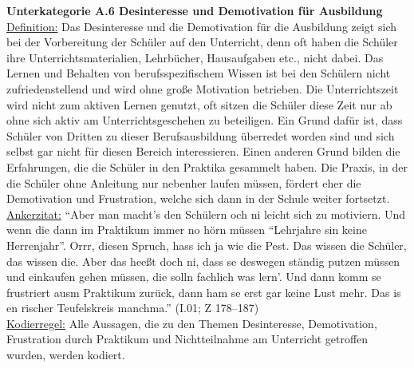\textbf{Unterkategorie A.6 Desinteresse und Demotivation für Ausbildung}\\
\underline{Definition:} Das Desinteresse und die Demotivation für die Ausbildung zeigt sich bei der Vorbereitung der Schüler auf den Unterricht, denn oft haben die Schüler ihre Unterrichtsmaterialien, Lehrbücher, Hausaufgaben etc., nicht dabei. Das Lernen und Behalten von berufsspezifischem Wissen ist bei den Schülern nicht zufriedenstellend und wird ohne große Motivation betrieben. Die Unterrichtszeit wird nicht zum aktiven Lernen genutzt, oft sitzen die Schüler diese Zeit nur ab ohne sich aktiv am Unterrichtsgeschehen zu beteiligen. Ein Grund dafür ist, dass Schüler von Dritten zu dieser Berufsausbildung überredet worden sind und sich selbst gar nicht für diesen Bereich interessieren. Einen anderen Grund bilden die Erfahrungen, die die Schüler in den Praktika gesammelt haben. Die Praxis, in der die Schüler ohne Anleitung nur nebenher laufen müssen, fördert eher die Demotivation und Frustration, welche sich dann in der Schule weiter fortsetzt.\\
\underline{Ankerzitat:} "`Aber man macht’s den Schülern och ni leicht sich zu motiviern. Und wenn die dann im Praktikum immer no hörn müssen "`Lehrjahre sin keine Herrenjahr"'. Orrr, diesen Spruch, hass ich ja wie die Pest. Das wissen die Schüler, das wissen die. Aber das heeßt doch ni, dass se deswegen ständig putzen müssen und einkaufen gehen müssen, die solln fachlich was lern'. Und dann komm se frustriert ausm Praktikum zurück, dann ham se erst gar keine Lust mehr. Das is en rischer Teufelskreis manchma."' (I.01; Z 178--187)\\
\underline{Kodierregel:} Alle Aussagen, die zu den Themen Desinteresse, Demotivation, Frustration durch Praktikum und Nichtteilnahme am Unterricht getroffen wurden, werden kodiert.\\

